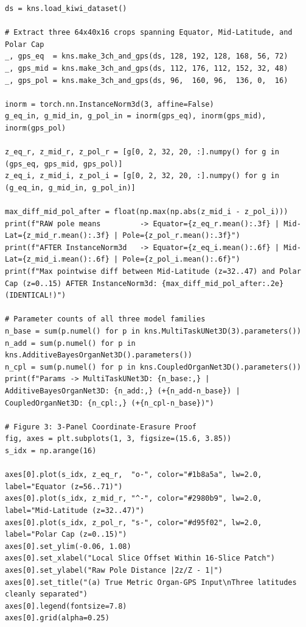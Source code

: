 \documentclass[10pt,a4paper]{article}
\renewcommand{\_}{\origunderscore\allowbreak}
\begin{document}
\begin{codebox}
\begin{lstlisting}[style=pybmed]
ds = kns.load_kiwi_dataset()

# Extract three 64x40x16 crops spanning Equator, Mid-Latitude, and Polar Cap
_, gps_eq  = kns.make_3ch_and_gps(ds, 128, 192, 128, 168, 56, 72)
_, gps_mid = kns.make_3ch_and_gps(ds, 112, 176, 112, 152, 32, 48)
_, gps_pol = kns.make_3ch_and_gps(ds, 96,  160, 96,  136, 0,  16)

inorm = torch.nn.InstanceNorm3d(3, affine=False)
g_eq_in, g_mid_in, g_pol_in = inorm(gps_eq), inorm(gps_mid), inorm(gps_pol)

z_eq_r, z_mid_r, z_pol_r = [g[0, 2, 32, 20, :].numpy() for g in (gps_eq, gps_mid, gps_pol)]
z_eq_i, z_mid_i, z_pol_i = [g[0, 2, 32, 20, :].numpy() for g in (g_eq_in, g_mid_in, g_pol_in)]

max_diff_mid_pol_after = float(np.max(np.abs(z_mid_i - z_pol_i)))
print(f"RAW pole means         -> Equator={z_eq_r.mean():.3f} | Mid-Lat={z_mid_r.mean():.3f} | Pole={z_pol_r.mean():.3f}")
print(f"AFTER InstanceNorm3d   -> Equator={z_eq_i.mean():.6f} | Mid-Lat={z_mid_i.mean():.6f} | Pole={z_pol_i.mean():.6f}")
print(f"Max pointwise diff between Mid-Latitude (z=32..47) and Polar Cap (z=0..15) AFTER InstanceNorm3d: {max_diff_mid_pol_after:.2e} (IDENTICAL!)")

# Parameter counts of all three model families
n_base = sum(p.numel() for p in kns.MultiTaskUNet3D(3).parameters())
n_add = sum(p.numel() for p in kns.AdditiveBayesOrganNet3D().parameters())
n_cpl = sum(p.numel() for p in kns.CoupledOrganNet3D().parameters())
print(f"Params -> MultiTaskUNet3D: {n_base:,} | AdditiveBayesOrganNet3D: {n_add:,} (+{n_add-n_base}) | CoupledOrganNet3D: {n_cpl:,} (+{n_cpl-n_base})")

# Figure 3: 3-Panel Coordinate-Erasure Proof
fig, axes = plt.subplots(1, 3, figsize=(15.6, 3.85))
s_idx = np.arange(16)

axes[0].plot(s_idx, z_eq_r,  "o-", color="#1b8a5a", lw=2.0, label="Equator (z=56..71)")
axes[0].plot(s_idx, z_mid_r, "^-", color="#2980b9", lw=2.0, label="Mid-Latitude (z=32..47)")
axes[0].plot(s_idx, z_pol_r, "s-", color="#d95f02", lw=2.0, label="Polar Cap (z=0..15)")
axes[0].set_ylim(-0.06, 1.08)
axes[0].set_xlabel("Local Slice Offset Within 16-Slice Patch")
axes[0].set_ylabel("Raw Pole Distance |2z/Z - 1|")
axes[0].set_title("(a) True Metric Organ-GPS Input\nThree latitudes cleanly separated")
axes[0].legend(fontsize=7.8)
axes[0].grid(alpha=0.25)


\end{lstlisting}
\end{codebox}
\end{document}
